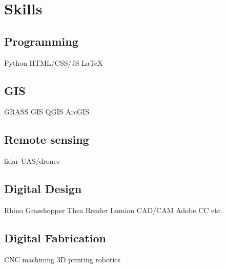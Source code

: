 \documentclass[]{baharmon-cv}
\begin{document}
\section{Skills}
\normalsize{
\begin{minipage}[t]{0.4\textwidth} 
\subsection{Programming}
\vspace*{0.1cm}
Python \textbullet{} HTML/CSS/JS \textbullet{} \LaTeX\ \\ 
\linespread{0.1}
%
\subsection{GIS}
\vspace*{0.1cm}
GRASS GIS \textbullet{} QGIS  \textbullet{} ArcGIS\\ 
\linespread{0.1}
%
\subsection{Remote sensing}
\vspace*{0.1cm}
lidar \textbullet{} UAS/drones \\ 
\linespread{0.1}
\end{minipage} 
%
\hfill
%
\begin{minipage}[t]{0.5\textwidth}
\subsection{Digital Design}
\vspace*{0.1cm}
Rhino \textbullet{} Grasshopper \textbullet{} Thea Render \textbullet{} Lumion \textbullet{} CAD/CAM \textbullet{} Adobe CC \textbullet{} etc. \\ 
\linespread{0.1}
%
\subsection{Digital Fabrication}
\vspace*{0.1cm}
CNC machining \textbullet{} 3D printing \textbullet{} robotics\\ 
\linespread{0.1}
\end{minipage} 
%
\hfill
\\
}
\end{document}
